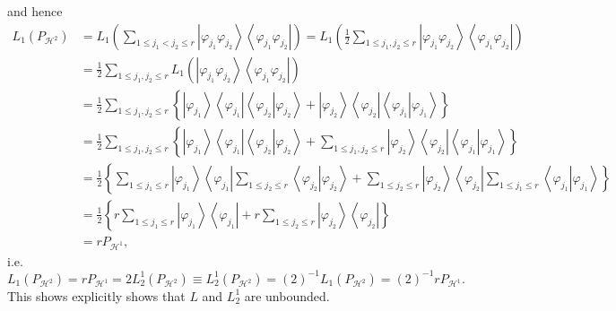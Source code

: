 \documentclass[aps,preprint]{revtex4}%
\begin{document}
and hence
\begin{align}
L_{1}\left(  P_{\mathcal{H}^{2}}\right)   &  =L_{1}\left(  \sum_{1\leq
j_{1}<j_{2}\leq r}\left\vert \varphi_{j_{1}}\varphi_{j_{2}}\right\rangle
\left\langle \varphi_{j_{1}}\varphi_{j_{2}}\right\vert \right)  =L_{1}\left(
\frac{1}{2}\sum_{1\leq j_{1},j_{2}\leq r}\left\vert \varphi_{j_{1}}%
\varphi_{j_{2}}\right\rangle \left\langle \varphi_{j_{1}}\varphi_{j_{2}%
}\right\vert \right) \nonumber\\
&  =\frac{1}{2}\sum_{1\leq j_{1},j_{2}\leq r}L_{1}\left(  \left\vert
\varphi_{j_{1}}\varphi_{j_{2}}\right\rangle \left\langle \varphi_{j_{1}%
}\varphi_{j_{2}}\right\vert \right) \nonumber\\
&  =\frac{1}{2}\sum_{1\leq j_{1},j_{2}\leq r}\left\{  \left\vert
\varphi_{j_{1}}\right\rangle \left\langle \varphi_{j_{1}}\right\vert
\left\langle \varphi_{j_{2}}\left\vert \varphi_{j_{2}}\right.  \right\rangle
+\left\vert \varphi_{j_{2}}\right\rangle \left\langle \varphi_{j_{2}%
}\right\vert \left\langle \varphi_{j_{1}}\left\vert \varphi_{j_{1}}\right.
\right\rangle \right\} \nonumber\\
&  =\frac{1}{2}\sum_{1\leq j_{1},j_{2}\leq r}\left\{  \left\vert
\varphi_{j_{1}}\right\rangle \left\langle \varphi_{j_{1}}\right\vert
\left\langle \varphi_{j_{2}}\left\vert \varphi_{j_{2}}\right.  \right\rangle
+\sum_{1\leq j_{1},j_{2}\leq r}\left\vert \varphi_{j_{2}}\right\rangle
\left\langle \varphi_{j_{2}}\right\vert \left\langle \varphi_{j_{1}}\left\vert
\varphi_{j_{1}}\right.  \right\rangle \right\} \nonumber\\
&  =\frac{1}{2}\left\{  \sum_{1\leq j_{1}\leq r}\left\vert \varphi_{j_{1}%
}\right\rangle \left\langle \varphi_{j_{1}}\right\vert \sum_{1\leq j_{2}\leq
r}\left\langle \varphi_{j_{2}}\left\vert \varphi_{j_{2}}\right.  \right\rangle
+\sum_{1\leq j_{2}\leq r}\left\vert \varphi_{j_{2}}\right\rangle \left\langle
\varphi_{j_{2}}\right\vert \sum_{1\leq j_{1}\leq r}\left\langle \varphi
_{j_{1}}\left\vert \varphi_{j_{1}}\right.  \right\rangle \right\} \nonumber\\
&  =\frac{1}{2}\left\{  r\sum_{1\leq j_{1}\leq r}\left\vert \varphi_{j_{1}%
}\right\rangle \left\langle \varphi_{j_{1}}\right\vert +r\sum_{1\leq j_{2}\leq
r}\left\vert \varphi_{j_{2}}\right\rangle \left\langle \varphi_{j_{2}%
}\right\vert \right\} \nonumber\\
&  =rP_{\mathcal{H}^{1}},
\end{align}
i.e.
\begin{equation}
L_{1}\left(  P_{\mathcal{H}^{2}}\right)  =rP_{\mathcal{H}^{1}}=2L_{2}%
^{1}\left(  P_{\mathcal{H}^{2}}\right)  \equiv L_{2}^{1}\left(  P_{\mathcal{H}%
^{2}}\right)  =\left(  2\right)  ^{-1}L_{1}\left(  P_{\mathcal{H}^{2}}\right)
=\left(  2\right)  ^{-1}rP_{\mathcal{H}^{1}}.
\end{equation}
This shows explicitly shows that $L$ and $L_{2}^{1}$ are unbounded.
\end{document}
